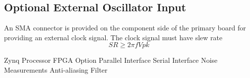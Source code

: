 \documentclass[letterpaper,12pt]{article}
\begin{document}
\subsection{Optional External Oscillator Input}
An SMA connector is provided on the component side of the primary board 
for providing an external clock signal. The clock signal must have slew rate 
\[
  SR \geq 2\pi f  Vpk
\]

Zynq Processor FPGA Option
Parallel Interface 
Serial Interface 
Noise Measurements
Anti-aliasing Filter
\end{document}
